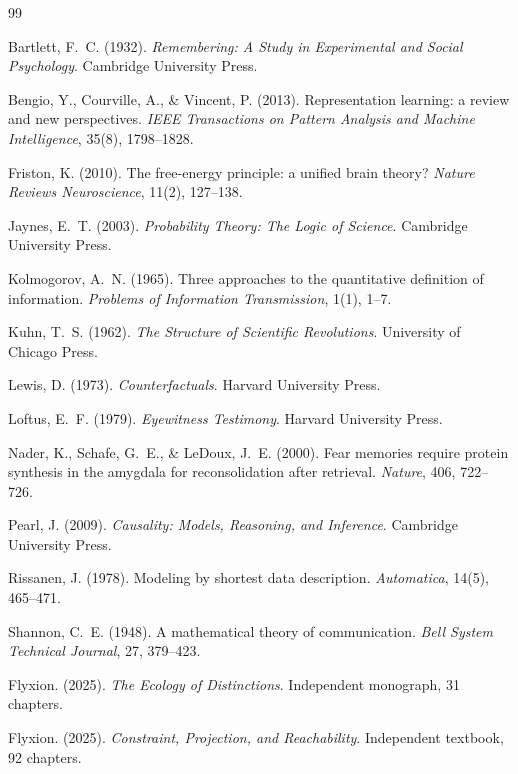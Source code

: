 \documentclass[11pt, a4paper]{article}
\theoremstyle{plain}
\theoremstyle{definition}
\theoremstyle{remark}
\begin{document}
\begin{thebibliography}{99}

Bartlett, F.~C. (1932).
\textit{Remembering: A Study in Experimental and Social Psychology}.
Cambridge University Press.

Bengio, Y., Courville, A., \& Vincent, P. (2013).
Representation learning: a review and new perspectives.
\textit{IEEE Transactions on Pattern Analysis and Machine Intelligence},
35(8), 1798--1828.

Friston, K. (2010).
The free-energy principle: a unified brain theory?
\textit{Nature Reviews Neuroscience}, 11(2), 127--138.

Jaynes, E.~T. (2003).
\textit{Probability Theory: The Logic of Science}.
Cambridge University Press.

Kolmogorov, A.~N. (1965).
Three approaches to the quantitative definition of information.
\textit{Problems of Information Transmission}, 1(1), 1--7.

Kuhn, T.~S. (1962).
\textit{The Structure of Scientific Revolutions}.
University of Chicago Press.

Lewis, D. (1973).
\textit{Counterfactuals}.
Harvard University Press.

Loftus, E.~F. (1979).
\textit{Eyewitness Testimony}.
Harvard University Press.

Nader, K., Schafe, G.~E., \& LeDoux, J.~E. (2000).
Fear memories require protein synthesis in the amygdala for
reconsolidation after retrieval.
\textit{Nature}, 406, 722--726.

Pearl, J. (2009).
\textit{Causality: Models, Reasoning, and Inference}.
Cambridge University Press.

Rissanen, J. (1978).
Modeling by shortest data description.
\textit{Automatica}, 14(5), 465--471.

Shannon, C.~E. (1948).
A mathematical theory of communication.
\textit{Bell System Technical Journal}, 27, 379--423.

Flyxion. (2025).
\textit{The Ecology of Distinctions}.
Independent monograph, 31 chapters.

Flyxion. (2025).
\textit{Constraint, Projection, and Reachability}.
Independent textbook, 92 chapters.


\end{thebibliography}
\end{document}
